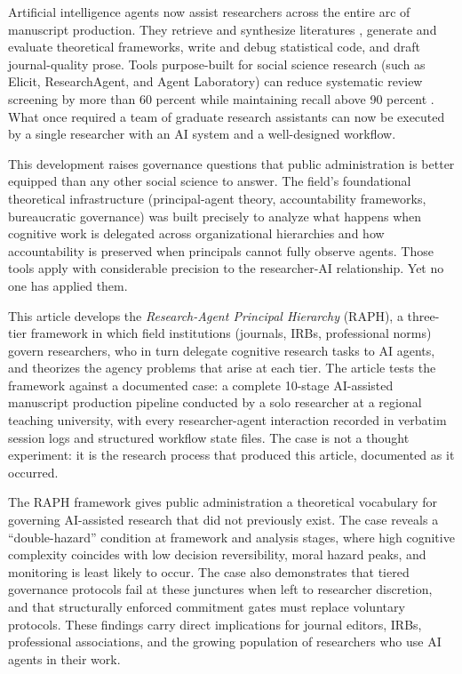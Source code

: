\documentclass[12pt]{article}
\begin{document}
Artificial intelligence agents now assist researchers across the entire arc of manuscript
production. They retrieve and synthesize literatures \citep{schmidgall2025agent},
generate and evaluate theoretical frameworks, write and debug statistical code, and draft
journal-quality prose. Tools purpose-built for social science research (such as Elicit,
ResearchAgent, and Agent Laboratory) can reduce systematic review screening by more than 60
percent while maintaining recall above 90 percent \citep{hasan2024integrating}. What once
required a team of graduate research assistants can now be executed by a single researcher
with an AI system and a well-designed workflow.

This development raises governance questions that public administration is better equipped
than any other social science to answer. The field's foundational theoretical infrastructure
(principal-agent theory, accountability frameworks, bureaucratic governance) was built
precisely to analyze what happens when cognitive work is delegated across organizational
hierarchies and how accountability is preserved when principals cannot fully observe agents.
Those tools apply with considerable precision to the researcher-AI relationship. Yet no one
has applied them.

This article develops the \emph{Research-Agent Principal Hierarchy}
(RAPH), a three-tier framework in which field institutions (journals, IRBs, professional
norms) govern researchers, who in turn delegate cognitive research tasks to AI agents, and
theorizes the agency problems that arise at each tier. The article tests the framework against a
documented case: a complete 10-stage AI-assisted manuscript production pipeline conducted
by a solo researcher at a regional teaching university, with every researcher-agent
interaction recorded in verbatim session logs and structured workflow state files. The case
is not a thought experiment: it is the research process that produced this article,
documented as it occurred.

The RAPH framework gives public administration a theoretical vocabulary for governing
AI-assisted research that did not previously exist. The case reveals a ``double-hazard''
condition at framework and analysis stages, where high cognitive complexity coincides with
low decision reversibility, moral hazard peaks, and monitoring is least likely to occur.
The case also demonstrates that tiered governance protocols fail at these junctures when left
to researcher discretion, and that structurally enforced commitment gates must replace
voluntary protocols. These findings carry direct implications for journal editors, IRBs,
professional associations, and the growing population of researchers who use AI agents in
their work.
\end{document}
